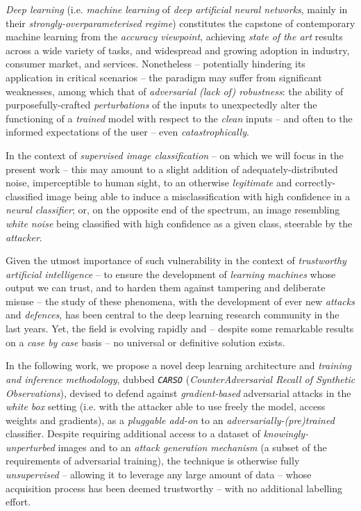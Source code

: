 

\textit{Deep learning} (i.e. \textit{machine learning} of \textit{deep artificial neural networks}, mainly in their \textit{strongly-overparameterised regime}) constitutes the capstone of contemporary machine learning from the \textit{accuracy viewpoint}, achieving \textit{state of the art}  results across a wide variety of tasks, and widespread and growing adoption in industry, consumer market, and services. Nonetheless – potentially hindering its application in critical scenarios – the paradigm may suffer from significant weaknesses, among which that of \textit{adversarial (lack of) robustness}: the ability of purposefully-crafted \textit{perturbations} of the inputs to unexpectedly alter the functioning of a \textit{trained} model with respect to the \textit{clean} inputs – and often to the informed expectations of the user – even \textit{catastrophically}.

In the context of \textit{supervised image classification} – on which we will focus in the present work – this may amount to a slight addition of adequately-distributed noise, imperceptible to human sight, to an otherwise \textit{legitimate} and correctly-classified image being able to induce a misclassification with high confidence in a \textit{neural classifier}; or, on the opposite end of the spectrum, an image resembling \textit{white noise} being classified with high confidence as a given class, steerable by the \textit{attacker}.

Given the utmost importance of such vulnerability in the context of \textit{trustworthy artificial intelligence} – to ensure the development of \textit{learning machines} whose output we can trust, and to harden them against tampering and deliberate misuse – the study of these phenomena, with the development of ever new \textit{attacks} and \textit{defences}, has been central to the deep learning research community in the last years. Yet, the field is evolving rapidly and – despite some remarkable results on a \textit{case by case} basis – no universal or definitive solution exists.

In the following work, we propose a novel deep learning architecture and \textit{training and inference methodology}, dubbed \textit{\texttt{CARSO}} (\textit{CounterAdversarial Recall of Synthetic Observations}), devised to defend against \textit{gradient-based} adversarial attacks in the \textit{white box} setting (i.e. with the attacker able to use freely the model, access weights and gradients), as a \textit{pluggable add-on} to an \textit{adversarially-(pre)trained} classifier. Despite requiring additional access to a dataset of \textit{knowingly-unperturbed} images and to an \textit{attack generation mechanism} (a subset of the requirements of adversarial training), the technique is otherwise fully \textit{unsupervised} – allowing it to leverage any large amount of data – whose acquisition process has been deemed trustworthy – with no additional labelling effort.


